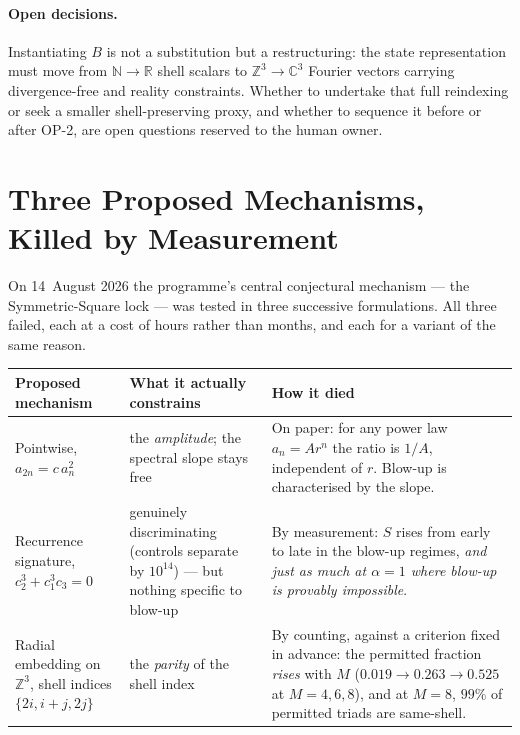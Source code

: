 \documentclass[11pt,a4paper]{article}
\newcommand{\Z}{\mathbb{Z}}
\newcommand{\N}{\mathbb{N}}
\newcommand{\R}{\mathbb{R}}
\newcommand{\C}{\mathbb{C}}
\theoremstyle{definition}
\theoremstyle{plain}
\begin{document}
\paragraph{Open decisions.} Instantiating $B$ is not a substitution but a restructuring: the
state representation must move from $\N\to\R$ shell scalars to $\Z^3\to\C^3$ Fourier vectors
carrying divergence-free and reality constraints. Whether to undertake that full reindexing or
seek a smaller shell-preserving proxy, and whether to sequence it before or after OP-2,
are open questions reserved to the human owner.

\section{Three Proposed Mechanisms, Killed by Measurement}
\label{sec:killed}

On 14~August 2026 the programme's central conjectural mechanism --- the Symmetric-Square lock ---
was tested in three successive formulations. All three failed, each at a cost of hours rather
than months, and each for a variant of the same reason.

\begin{center}
\small
\begin{tabular}{@{}p{4.3cm}p{5.1cm}p{5.4cm}@{}}
\toprule
\textbf{Proposed mechanism} & \textbf{What it actually constrains} & \textbf{How it died} \\
\midrule
Pointwise, $a_{2n}=c\,a_n^2$ & the \emph{amplitude}; the spectral slope stays free & On paper: for any power law $a_n=Ar^n$ the ratio is $1/A$, independent of $r$. Blow-up is characterised by the slope. \\
\addlinespace
Recurrence signature, $c_2^3+c_1^3c_3=0$ & genuinely discriminating (controls separate by $10^{14}$) --- but nothing specific to blow-up & By measurement: $S$ rises from early to late in the blow-up regimes, \emph{and just as much at $\alpha=1$ where blow-up is provably impossible}. \\
\addlinespace
Radial embedding on $\Z^3$, shell indices $\{2i,i+j,2j\}$ & the \emph{parity} of the shell index & By counting, against a criterion fixed in advance: the permitted fraction \emph{rises} with $M$ ($0.019\to0.263\to0.525$ at $M=4,6,8$), and at $M=8$, $99\%$ of permitted triads are same-shell. \\
\bottomrule
\end{tabular}
\end{center}
\end{document}
